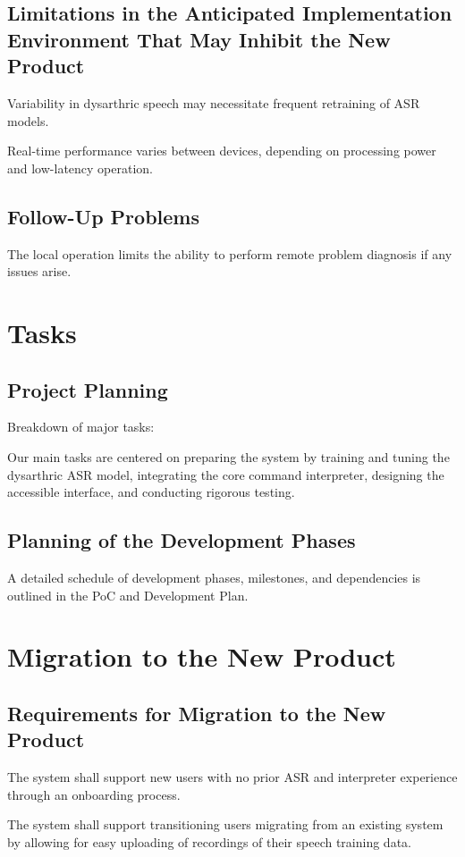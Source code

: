 \documentclass[11pt]{article}
\begin{document}
\subsection{Limitations in the Anticipated Implementation Environment That May
Inhibit the New Product}
Variability in dysarthric speech may necessitate frequent retraining of ASR models.

Real-time performance varies between devices, depending on processing power and low-latency operation.
\subsection{Follow-Up Problems}
The local operation limits the ability to perform remote problem diagnosis if any issues arise.


\section{Tasks}
\subsection{Project Planning}
Breakdown of major tasks:

Our main tasks are centered on preparing the system by training and tuning the dysarthric ASR model, integrating the core command interpreter, designing the accessible interface, and conducting rigorous testing.
\subsection{Planning of the Development Phases}
A detailed schedule of development phases, milestones, and dependencies is outlined in the PoC and Development Plan.

\section{Migration to the New Product}
\subsection{Requirements for Migration to the New Product}
The system shall support new users with no prior ASR and interpreter experience through an onboarding process. 

The system shall support transitioning users migrating from an existing system by allowing for easy uploading of recordings of their speech training data.
\end{document}
